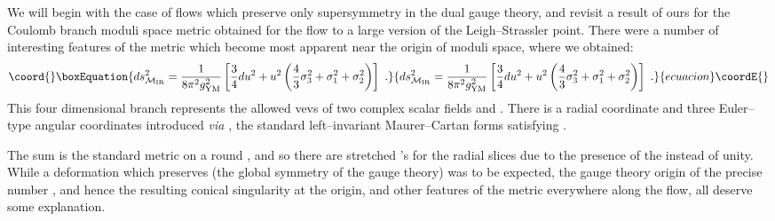 \documentclass[a4paper,12pt]{article}
\providecommand{\labell}[1]{\label{#1}}
\begin{document}
We will begin with the case of flows which preserve only \coordHE{}
supersymmetry in the dual gauge theory, and revisit a result of
ours\cite{jlp} for the Coulomb branch moduli space metric obtained for
the flow\cite{freed1,pw2} to a large \coordHE{} version of the
Leigh--Strassler point\cite{pilch,robmatt,lsflow}. There were a number of
interesting features of the metric which become most apparent near the
origin of moduli space, where we obtained:
\begin{equation}\coord{}\boxEquation{
ds^2_{{\cal M}_{\rm IR}}={1\over 8\pi^2 g_{\rm YM}^2}\left[{3\over4} du^2+
 u^2\left({4\over 3}\sigma_3^2+
{\sigma_1^2+\sigma_2^2}\right)\right]\ .
\labell{stretched}
}{
ds^2_{{\cal M}_{\rm IR}}={1\over 8\pi^2 g_{\rm YM}^2}\left[{3\over4} du^2+
 u^2\left({4\over 3}\sigma_3^2+
{\sigma_1^2+\sigma_2^2}\right)\right]\ .
\labell{stretched}
}{ecuacion}\coordE{}\end{equation}
This four dimensional branch represents the allowed vevs of two
complex scalar fields \coordHE{} and \coordHE{}.  There is a radial
coordinate \coordHE{} and three Euler--type angular coordinates
\coordHE{} introduced {\it via} \coordHE{}, the
standard left--invariant Maurer--Cartan forms satisfying
\coordHE{}.

The sum \coordHE{} is the standard metric on a round
\coordHE{}, and so there are stretched \coordHE{}'s for the radial slices due to
the presence of the \coordHE{} instead of unity. While a deformation which
preserves \coordHE{} (the global symmetry of the gauge
theory) was to be expected, the gauge theory origin of the precise
number \coordHE{}, and hence the resulting conical singularity at the
origin, and other features of the metric everywhere along the flow,
all deserve some explanation.
\end{document}
